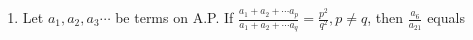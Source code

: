 \documentclass[journal,12pt,twocolumn]{IEEEtran}
\theoremstyle{remark}
\begin{document}
\begin{enumerate}[label={\arabic*.}]
\item {Let $a_1, a_2, a_3 \cdots$ be terms on A.P. If $\frac{a_1+a_2+\cdots a_p}{a_1+a_2+\cdots a_q}= \frac{p^2}{q^2},p \neq q$, then $\frac{a_6}{a_{21}}$ equals}
{\hfill{} }
\begin{enumerate}
\end{enumerate}
\end{enumerate}
\end{document}

